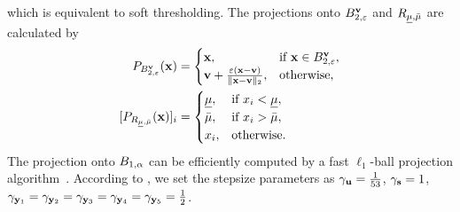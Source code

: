 which is equivalent to soft thresholding.
The projections onto $B_{2, \varepsilon}^{\mathbf{v}}$ and $R_{\underline{\mu},\bar{\mu}}$ are calculated by
\begin{align}
    \label{eq:ProjL2ball}
    P_{B_{2, \varepsilon}^{\mathbf{v}}}(\mathbf{x}) &= 
    \begin{cases}
        \mathbf{x}, & \text{if } \mathbf{x} \in B_{2, \varepsilon}^{\mathbf{v}}, \\ 
        \mathbf{v} + \frac{\varepsilon (\mathbf{x} - \mathbf{v})}{\| \mathbf{x} - \mathbf{v} \|_2}, & \text{otherwise,}
    \end{cases} \\
    \label{eq:ProjRange}
    \lbrack P_{R_{\underline{\mu},\bar{\mu}}} (\mathbf{x}) \rbrack_{i} 
    &= 
    \begin{cases} 
            \underline{\mu}, & \text{if } x_{i} < \underline{\mu}, \\ 
            \bar{\mu}, & \text{if } x_{i}> \bar{\mu}, \\ 
            x_{i}, & \text{otherwise.} 
    \end{cases}
\end{align}
The projection onto $B_{1, \alpha}$ can be efficiently computed by a fast $\ell_{1}$-ball projection algorithm~\cite{Condat2016L1ball}.
According to \cite{Naganuma2023PPDS}, we set the stepsize parameters as
$\gamma_{\mathbf{u}} = \frac{1}{53}$, $\gamma_{\mathbf{s}} = 1$, $\gamma_{\mathbf{y}_{1}} = \gamma_{\mathbf{y}_{2}} = \gamma_{\mathbf{y}_{3}} = \gamma_{\mathbf{y}_{4}} = \gamma_{\mathbf{y}_{5}} = \frac{1}{2}$.